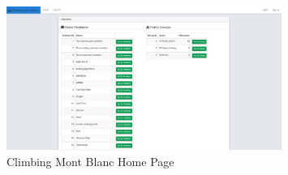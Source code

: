 \begin{figure}
    \centering
    \includegraphics[width=0.8\textwidth]{figs/front_page.jpg}
    \caption[Climbing Mont Blanc Home Page]{Climbing Mont Blanc Home Page}
    \label{fig:front-page}
\end{figure}

